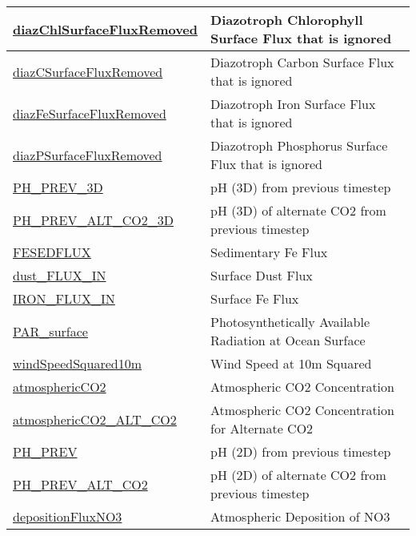 {\begin{center}
\begin{longtable}{| p{2.0in} | p{4.0in} |}
    \hline
    \hyperref[subsec:var_sec_forcing_diazChlSurfaceFluxRemoved]{diazChlSurfaceFluxRemoved} & Diazotroph Chlorophyll Surface Flux that is ignored \\
    \hline
    \hyperref[subsec:var_sec_forcing_diazCSurfaceFluxRemoved]{diazCSurfaceFluxRemoved} & Diazotroph Carbon Surface Flux that is ignored \\
    \hline
    \hyperref[subsec:var_sec_forcing_diazFeSurfaceFluxRemoved]{diazFeSurfaceFluxRemoved} & Diazotroph Iron Surface Flux that is ignored \\
    \hline
    \hyperref[subsec:var_sec_forcing_diazPSurfaceFluxRemoved]{diazPSurfaceFluxRemoved} & Diazotroph Phosphorus Surface Flux that is ignored \\
    \hline
    \hyperref[subsec:var_sec_forcing_PH_PREV_3D]{PH\_PREV\_3D} & pH (3D) from previous timestep \\
    \hline
    \hyperref[subsec:var_sec_forcing_PH_PREV_ALT_CO2_3D]{PH\_PREV\_ALT\_CO2\_3D} & pH (3D) of alternate CO2 from previous timestep \\
    \hline
    \hyperref[subsec:var_sec_forcing_FESEDFLUX]{FESEDFLUX} & Sedimentary Fe Flux \\
    \hline
    \hyperref[subsec:var_sec_forcing_dust_FLUX_IN]{dust\_FLUX\_IN} & Surface Dust Flux \\
    \hline
    \hyperref[subsec:var_sec_forcing_IRON_FLUX_IN]{IRON\_FLUX\_IN} & Surface Fe Flux \\
    \hline
    \hyperref[subsec:var_sec_forcing_PAR_surface]{PAR\_surface} & Photosynthetically Available Radiation at Ocean Surface \\
    \hline
    \hyperref[subsec:var_sec_forcing_windSpeedSquared10m]{windSpeedSquared10m} & Wind Speed at 10m Squared \\
    \hline
    \hyperref[subsec:var_sec_forcing_atmosphericCO2]{atmosphericCO2} & Atmospheric CO2 Concentration \\
    \hline
    \hyperref[subsec:var_sec_forcing_atmosphericCO2_ALT_CO2]{atmosphericCO2\_ALT\_CO2} & Atmospheric CO2 Concentration for Alternate CO2 \\
    \hline
    \hyperref[subsec:var_sec_forcing_PH_PREV]{PH\_PREV} & pH (2D) from previous timestep \\
    \hline
    \hyperref[subsec:var_sec_forcing_PH_PREV_ALT_CO2]{PH\_PREV\_ALT\_CO2} & pH (2D) of alternate CO2 from previous timestep \\
    \hline
    \hyperref[subsec:var_sec_forcing_depositionFluxNO3]{depositionFluxNO3} & Atmospheric Deposition of NO3 \\

\end{longtable}
\end{center}}
